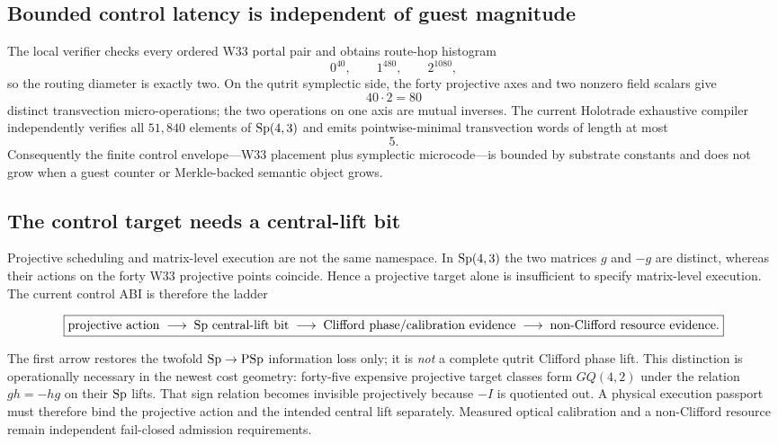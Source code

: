 \subsection*{Bounded control latency is independent of guest magnitude}

The local verifier checks every ordered W33 portal pair and obtains route-hop histogram
\[
0^{40},\qquad1^{480},\qquad2^{1080},
\]
so the routing diameter is exactly two.  On the qutrit symplectic side, the forty
projective axes and two nonzero field scalars give
\[
\boxed{40\cdot2=80}
\]
distinct transvection micro-operations; the two operations on one axis are mutual
inverses.  The current Holotrade exhaustive compiler independently verifies all
$51{,}840$ elements of $\mathrm{Sp}(4,3)$ and emits pointwise-minimal transvection words of
length at most
\[
\boxed{5}.
\]
Consequently the finite control envelope---W33 placement plus symplectic microcode---is
bounded by substrate constants and does not grow when a guest counter or Merkle-backed
semantic object grows.

\subsection*{The control target needs a central-lift bit}

Projective scheduling and matrix-level execution are not the same namespace.  In
$\mathrm{Sp}(4,3)$ the two matrices $g$ and $-g$ are distinct, whereas their actions on the
forty W33 projective points coincide.  Hence a projective target alone is insufficient
to specify matrix-level execution.  The current control ABI is therefore the ladder

\[
\boxed{
\text{projective action}
\;\longrightarrow\;
\text{$\mathrm{Sp}$ central-lift bit}
\;\longrightarrow\;
\text{Clifford phase/calibration evidence}
\;\longrightarrow\;
\text{non-Clifford resource evidence}.
}
\]

The first arrow restores the twofold $\mathrm{Sp}\to\mathrm{PSp}$ information loss only; it is \emph{not}
a complete qutrit Clifford phase lift.  This distinction is operationally necessary in
the newest cost geometry: forty-five expensive projective target classes form
$GQ(4,2)$ under the relation $gh=-hg$ on their $\mathrm{Sp}$ lifts.  That sign relation becomes
invisible projectively because $-I$ is quotiented out.  A physical execution passport
must therefore bind the projective action and the intended central lift separately.
Measured optical calibration and a non-Clifford resource remain independent fail-closed
admission requirements.

